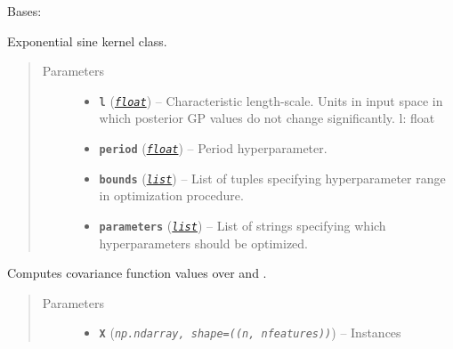 \documentclass[letterpaper,10pt,english]{sphinxmanual}
\begin{document}

\begin{fulllineitems}
\label{pyGPGO.covfunc:pyGPGO.covfunc.expSine}
Bases: \href{https://docs.python.org/2/library/functions.html\#object}{}

Exponential sine kernel class.
\begin{quote}\begin{description}
\item[{Parameters}] \leavevmode\begin{itemize}
\item {} 
\textbf{\texttt{l}} (\href{https://docs.python.org/2/library/functions.html\#float}{\emph{\texttt{float}}}) -- Characteristic length-scale. Units in input space in which posterior GP values do not
change significantly.    l: float

\item {} 
\textbf{\texttt{period}} (\href{https://docs.python.org/2/library/functions.html\#float}{\emph{\texttt{float}}}) -- Period hyperparameter.

\item {} 
\textbf{\texttt{bounds}} (\href{https://docs.python.org/2/library/functions.html\#list}{\emph{\texttt{list}}}) -- List of tuples specifying hyperparameter range in optimization procedure.

\item {} 
\textbf{\texttt{parameters}} (\href{https://docs.python.org/2/library/functions.html\#list}{\emph{\texttt{list}}}) -- List of strings specifying which hyperparameters should be optimized.

\end{itemize}

\end{description}\end{quote}

\begin{fulllineitems}
\label{pyGPGO.covfunc:pyGPGO.covfunc.expSine.K}
Computes covariance function values over  and .
\begin{quote}\begin{description}
\item[{Parameters}] \leavevmode\begin{itemize}
\item {} 
\textbf{\texttt{X}} (\emph{\texttt{np.ndarray, shape=((n, nfeatures))}}) -- Instances


\end{itemize}
\end{description}
\end{quote}
\end{fulllineitems}
\end{fulllineitems}
\end{document}
